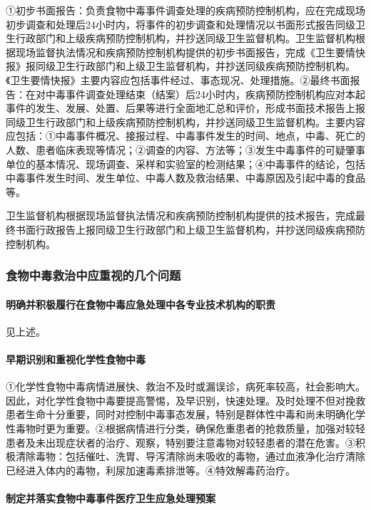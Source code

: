 ①初步书面报告：负责食物中毒事件调查处理的疾病预防控制机构，应在完成现场初步调查和处理后24小时内，将事件的初步调查和处理情况以书面形式报告同级卫生行政部门和上级疾病预防控制机构，并抄送同级卫生监督机构。卫生监督机构根据现场监督执法情况和疾病预防控制机构提供的初步书面报告，完成《卫生要情快报》报同级卫生行政部门和上级卫生监督机构，并抄送同级疾病预防控制机构。《卫生要情快报》主要内容应包括事件经过、事态现况、处理措施。②最终书面报告：在对中毒事件调查处理结束（结案）后24小时内，疾病预防控制机构应对本起事件的发生、发展、处置、后果等进行全面地汇总和评价，形成书面技术报告上报同级卫生行政部门和上级疾病预防控制机构，并抄送同级卫生监督机构。主要内容应包括：①中毒事件概况、接报过程、中毒事件发生的时间、地点，中毒、死亡的人数、患者临床表现等情况；②调查的内容、方法等；③发生中毒事件的可疑肇事单位的基本情况、现场调查、采样和实验室的检测结果；④中毒事件的结论，包括中毒事件发生时间、发生单位、中毒人数及救治结果、中毒原因及引起中毒的食品等。

卫生监督机构根据现场监督执法情况和疾病预防控制机构提供的技术报告，完成最终书面行政报告上报同级卫生行政部门和上级卫生监督机构，并抄送同级疾病预防控制机构。

\subsubsection{食物中毒救治中应重视的几个问题}

\paragraph{明确并积极履行在食物中毒应急处理中各专业技术机构的职责}

见上述。

\paragraph{早期识别和重视化学性食物中毒}

①化学性食物中毒病情进展快、救治不及时或漏误诊，病死率较高，社会影响大。因此，对化学性食物中毒要提高警惕，及早识别，快速处理。及时处理不但对挽救患者生命十分重要，同时对控制中毒事态发展，特别是群体性中毒和尚未明确化学性毒物时更为重要。②根据病情进行分类，确保危重患者的抢救质量，加强对较轻患者及未出现症状者的治疗、观察，特别要注意毒物对较轻患者的潜在危害。③积极清除毒物：包括催吐、洗胃、导泻清除尚未吸收的毒物，通过血液净化治疗清除已经进入体内的毒物，利尿加速毒素排泄等。④特效解毒药治疗。

\paragraph{制定并落实食物中毒事件医疗卫生应急处理预案}

